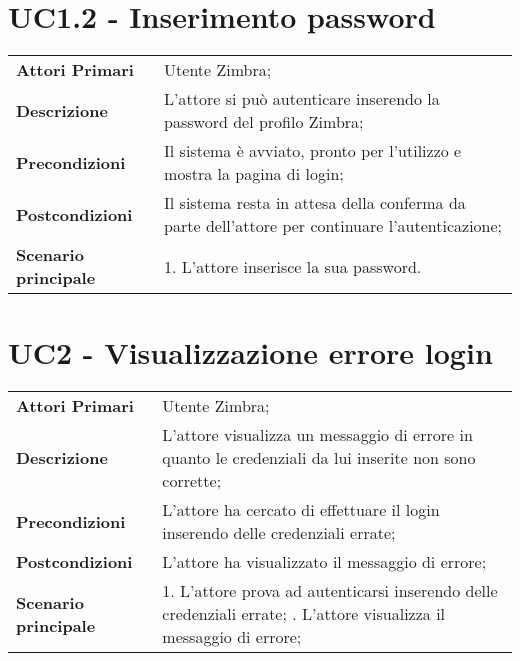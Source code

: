 \section{UC1.2 - Inserimento password}
	\begin{center}
	\bgroup
	\def\arraystretch{1.8}     
	\begin{longtable}{  p{4cm} | p{9.5cm} } 
		\textbf{Attori Primari} & Utente Zimbra; \\ 
		\textbf{Descrizione} & L’attore si può autenticare inserendo la password del profilo Zimbra; \\ 
		\textbf{Precondizioni}  & Il sistema è avviato, pronto per l’utilizzo e mostra la pagina di login; \\
		\textbf{Postcondizioni} & Il sistema resta in attesa della conferma da parte dell'attore per continuare l'autenticazione;  \\ 
		\textbf{Scenario principale} & 
		1. L’attore inserisce la sua password.
	\end{longtable}
	\egroup
\end{center}

\section{UC2 - Visualizzazione errore login} \label{UC2}
	\begin{center}
	\bgroup
	\def\arraystretch{1.8}     
	\begin{longtable}{  p{4cm} | p{9.5cm} } 
		\textbf{Attori Primari} & Utente Zimbra; \\ 
		\textbf{Descrizione} &  L'attore visualizza un messaggio di errore in quanto le credenziali da lui inserite non sono corrette; \\ 
		\textbf{Precondizioni}  & L'attore ha cercato di effettuare il login inserendo delle credenziali errate; \\
		\textbf{Postcondizioni} & L'attore ha visualizzato il messaggio di errore;  \\ 
		\textbf{Scenario principale} & 
		1. L'attore prova ad autenticarsi inserendo delle credenziali errate; \newline
		2. L'attore visualizza il messaggio di errore;
	\end{longtable}
	\egroup
\end{center}


